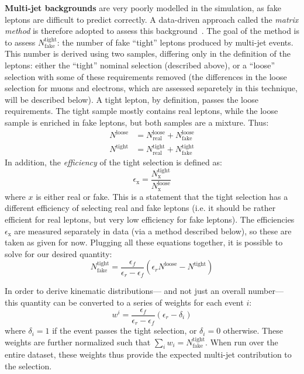 \textbf{Multi-jet backgrounds} are very poorly modelled in the simulation, as fake leptons are difficult to predict correctly. A data-driven approach called the \textit{matrix method} is therefore adopted to assess this background~\cite{MatrixMethod,ATLAS-CONF-2014-058}. The goal of the method is to assess $N_\mathrm{fake}^\mathrm{tight}$: the number of fake ``tight'' leptons produced by multi-jet events.  This number is derived using two samples, differing only in the definition of the leptons: either the ``tight'' nominal selection (described above), or a ``loose'' selection with some of these requirements removed (the differences in the loose selection for muons and electrons, which are assessed separetely in this technique, will be described below). A tight lepton, by definition, passes the loose requirements. The tight sample mostly contains real leptons, while the loose sample is enriched in fake leptons, but both samples are a mixture. Thus:
%
\begin{align}
N^\mathrm{loose} &= N_\mathrm{real}^\mathrm{loose} + N_\mathrm{fake}^\mathrm{loose}\\
N^\mathrm{tight} &= N_\mathrm{real}^\mathrm{tight} + N_\mathrm{fake}^\mathrm{tight}
\end{align}
%
In addition, the \textit{efficiency} of the tight selection is defined as:
%
\begin{equation}
\epsilon_\mathrm{x} = \frac{N^\mathrm{tight}_\mathrm{x}}{N^\mathrm{loose}_\mathrm{x}}
\end{equation}
%
where $x$ is either real or fake. This is a statement that the tight selection has a different efficiency of selecting real and fake leptons (i.e. it should be rather efficient for real leptons, but very low efficiency for fake leptons). The efficiencies $\epsilon_\mathrm{x}$ are measured separately in data (via a method described below), so these are taken as given for now. Plugging all these equations together, it is possible to solve for our desired quantity:
%
\begin{equation}
N_\mathrm{fake}^\mathrm{tight} = \frac{\epsilon_f}{\epsilon_r - \epsilon_f} \left(\epsilon_r N^\mathrm{loose} - N^\mathrm{tight} \right)
\end{equation}

In order to derive kinematic distributions--- and not just an overall number--- this quantity can be converted to a series of weights for each event $i$:
%
\begin{equation}
w^i = \frac{\epsilon_f}{\epsilon_r - \epsilon_f} (\epsilon_r - \delta_i)
\end{equation}
%
where $\delta_i = 1$ if the event passes the tight selection, or $\delta_i = 0$ otherwise. These weights are further normalized such that $\sum_i w_i = N_\mathrm{fake}^\mathrm{tight}$. When run over the entire dataset, these weights thus provide the expected multi-jet contribution to the selection.

